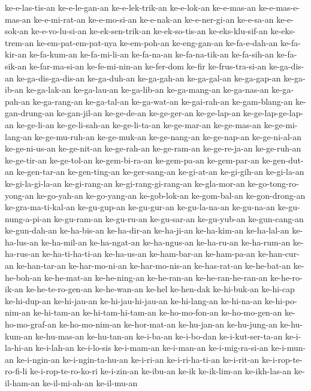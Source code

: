 {ke-e-las-tis-an ke-e-le-gan-an ke-e-lek-trik-an ke-e-lok-an ke-e-mas-an
ke-e-mas-e-mas-an ke-e-mi-rat-an ke-e-mo-si-an ke-e-nak-an ke-e-ner-gi-an
ke-e-sa-an ke-e-sok-an ke-e-vo-lu-si-an ke-ek-sen-trik-an ke-ek-so-tis-an
ke-eks-klu-sif-an ke-eks-trem-an ke-em-pat-em-pat-nya ke-em-poh-an
ke-eng-gan-an ke-fa-e-dah-an ke-fa-kir-an ke-fa-kum-an ke-fa-mi-li-an
ke-fa-na-an ke-fa-na-tik-an ke-fa-sih-an ke-fa-sik-an ke-far-ma-si-an
ke-fe-mi-nin-an ke-fer-dom ke-fir ke-frus-tra-si-an ke-ga-dis-an
ke-ga-dis-ga-dis-an ke-ga-duh-an ke-ga-gah-an ke-ga-gal-an ke-ga-gap-an
ke-ga-ib-an ke-ga-lak-an ke-ga-lau-an ke-ga-lib-an ke-ga-mang-an
ke-ga-nas-an ke-ga-pah-an ke-ga-rang-an ke-ga-tal-an ke-ga-wat-an
ke-gai-rah-an ke-gam-blang-an ke-gan-drung-an ke-gan-jil-an ke-ge-de-an
ke-ge-ger-an ke-ge-lap-an ke-ge-lap-ge-lap-an ke-ge-li-an ke-ge-li-sah-an
ke-ge-li-ta-an ke-ge-mar-an ke-ge-mas-an ke-ge-mi-lang-an ke-ge-mu-ruh-an
ke-ge-muk-an ke-ge-nang-an ke-ge-nap-an ke-ge-ni-al-an ke-ge-ni-us-an
ke-ge-nit-an ke-ge-rah-an ke-ge-ram-an ke-ge-re-ja-an ke-ge-ruh-an
ke-ge-tir-an ke-ge-tol-an ke-gem-bi-ra-an ke-gem-pa-an ke-gem-par-an
ke-gen-dut-an ke-gen-tar-an ke-gen-ting-an ke-ger-sang-an ke-gi-at-an
ke-gi-gih-an ke-gi-la-an ke-gi-la-gi-la-an ke-gi-rang-an
ke-gi-rang-gi-rang-an ke-gla-mor-an ke-go-tong-ro-yong-an ke-go-yah-an
ke-go-yang-an ke-gob-lok-an ke-gom-bal-an ke-gon-drong-an
ke-gra-ma-ti-kal-an ke-gu-gup-an ke-gu-gur-an ke-gu-la-na-an ke-gu-na-an
ke-gu-nung-a-pi-an ke-gu-ram-an ke-gu-ru-an ke-gu-sar-an ke-gu-yub-an
ke-gun-cang-an ke-gun-dah-an ke-ha-bis-an ke-ha-dir-an ke-ha-ji-an
ke-ha-kim-an ke-ha-lal-an ke-ha-lus-an ke-ha-mil-an ke-ha-ngat-an
ke-ha-ngus-an ke-ha-ru-an ke-ha-rum-an ke-ha-rus-an ke-ha-ti-ha-ti-an
ke-ha-us-an ke-ham-bar-an ke-ham-pa-an ke-han-cur-an ke-han-tar-an
ke-har-mo-ni-an ke-har-mo-nis-an ke-has-rat-an ke-he-bat-an ke-he-boh-an
ke-he-mat-an ke-he-ning-an ke-he-ran-an ke-he-ran-he-ran-an ke-he-ro-ik-an
ke-he-te-ro-gen-an ke-he-wan-an ke-hel ke-hen-dak ke-hi-buk-an ke-hi-cap
ke-hi-dup-an ke-hi-jau-an ke-hi-jau-hi-jau-an ke-hi-lang-an ke-hi-na-an
ke-hi-po-nim-an ke-hi-tam-an ke-hi-tam-hi-tam-an ke-ho-mo-fon-an
ke-ho-mo-gen-an ke-ho-mo-graf-an ke-ho-mo-nim-an ke-hor-mat-an
ke-hu-jan-an ke-hu-jung-an ke-hu-kum-an ke-hu-mas-an ke-hu-tan-an
ke-i-ba-an ke-i-bo-dan ke-i-kut-ser-ta-an ke-i-la-hi-an ke-i-lah-an
ke-i-lo-sis ke-i-mam-an ke-i-man-an ke-i-mig-ra-si-an ke-i-mun-an
ke-i-ngin-an ke-i-ngin-ta-hu-an ke-i-ri-an ke-i-ri-ha-ti-an ke-i-rit-an
ke-i-rop-te-ro-fi-li ke-i-rop-te-ro-ko-ri ke-i-zin-an ke-ibu-an ke-ik
ke-ik-lim-an ke-ikh-las-an ke-il-ham-an ke-il-mi-ah-an ke-il-mu-an
}
